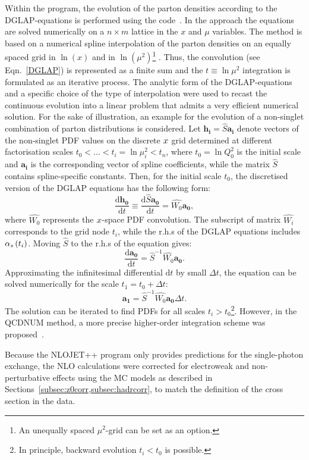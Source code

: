 Within the \herafitter program, the evolution of the parton densities according to the DGLAP-equations is performed using the \qcdnum code~\cite{Botje:2010ay}. In the \qcdnum approach the equations are solved numerically on a $n\times m$ lattice in the $x$ and $\mu$ variables. The method is based on a numerical spline interpolation of the parton densities on an equally spaced grid in $\ln\left(x\right)$ and in $\ln\left(\mu^2\right)$\footnote{An unequally spaced $\mu^2$-grid can be set as an option.} . Thus, the convolution (see Eqn.~\ref{DGLAP}) is represented as a finite sum and the $t \equiv \ln{\mu^2}$ integration is formulated as an iterative process.
The analytic form of the DGLAP-equations and a specific choice of the type of interpolation were used to recast the continuous evolution into a linear problem that admits a very efficient numerical solution. For the sake of illustration, an example for the evolution of a non-singlet combination of parton distributions is considered. Let $\mathbf{h_i}=\hat{S}\mathbf{a_i}$ denote vectors of the non-singlet PDF values on the discrete $\mbox{${x}$}$ grid determined at different factorisation scales $t_0 < ... < t_i=\ln{\mu^2_i} < t_n$, where $t_0=\ln{Q^2_0}$ is the initial scale and $\mathbf{a_i}$ is the corresponding vector of spline coefficients, while the matrix $\hat{S}$ contains spline-specific constants. Then, for the initial scale $t_0$, the discretised version of the DGLAP equations has the following form:
\begin{equation}
 \frac{\mathrm{d}\mathbf{h_0}}{\mathrm{d}t} \equiv \frac{\mathrm{d}\hat{S}\mathbf{a_0}}{\mathrm{d}t} = \hat{W_0}\mathbf{a_0},
\end{equation}
where $\hat{W_0}$ represents the $\mbox{${x}$}$-space PDF convolution. The subscript of matrix $\hat{W_i}$ corresponds to the grid node $t_i$, while the r.h.s of the DGLAP equations includes $\mbox{$\alpha_{s}$}\left(t_i\right)$. Moving $\hat{S}$ to the r.h.s of the equation gives:
\begin{equation}
 \frac{\mathrm{d}\mathbf{a_0}}{\mathrm{d}t} = \hat{S}^{-1}\hat{W_0}\mathbf{a_0}.
\end{equation}
Approximating the infinitesimal differential $\mathrm{d}t$ by small $\Delta t$, the equation can be solved numerically for the scale $t_1=t_0+\Delta t$:
\begin{equation}
 \mathbf{a_1} = \hat{S}^{-1}\hat{W_0}\mathbf{a_0}\Delta t.
\end{equation}
The solution can be iterated to find PDFs for all scales $t_i>t_0$\footnote{In principle, backward evolution $t_i<t_0$ is possible.}. However, in the QCDNUM method, a more precise higher-order integration scheme was proposed~\cite{Botje:2010ay}.

Because the NLOJET++ program only provides predictions for the single-photon exchange, the NLO calculations were corrected for electroweak and non-perturbative effects using the MC models as described in Sections~\ref{subsec:z0corr,subsec:hadrcorr}, to match the definition of the cross section in the data.
